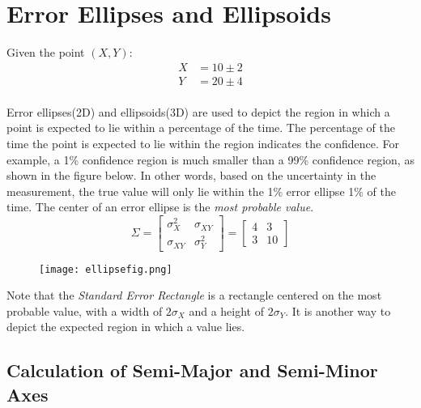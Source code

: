 \section{Error Ellipses and Ellipsoids}
Given the point $(X,Y)$:
\begin{align*}
X &= 10 \pm 2 \\
Y &= 20 \pm 4 \\
\end{align*}


Error ellipses(2D) and ellipsoids(3D) are used to depict the region in which a point is expected to lie within a percentage of the time.  The percentage of the time the point is expected to lie within the region indicates the confidence.  For example, a 1\% confidence region is much smaller than a 99\% confidence region, as shown in the figure below. In other words, based on the uncertainty in the measurement, the true value will only lie within the 1\% error ellipse 1\% of the time.  The center of an error ellipse is the \textit{most probable value}.
\[
\Sigma = 
\begin{bmatrix}
\sigma_X^2 & \sigma_{XY} \\
\sigma_{XY} & \sigma_Y^2 
\end{bmatrix}
=
\begin{bmatrix}
4 & 3 \\
3 & 10 
\end{bmatrix}
\]
\begin{figure}[H]
	\centering
	\texttt{[image: ellipsefig.png]}
\end{figure}

Note that the \textit{Standard Error Rectangle} is a rectangle centered on the most probable value, with a width of $2\sigma_X$ and a height of $2\sigma_Y$.  It is another way to depict the expected region in which a value lies.  

\subsection{Calculation of Semi-Major and Semi-Minor Axes}